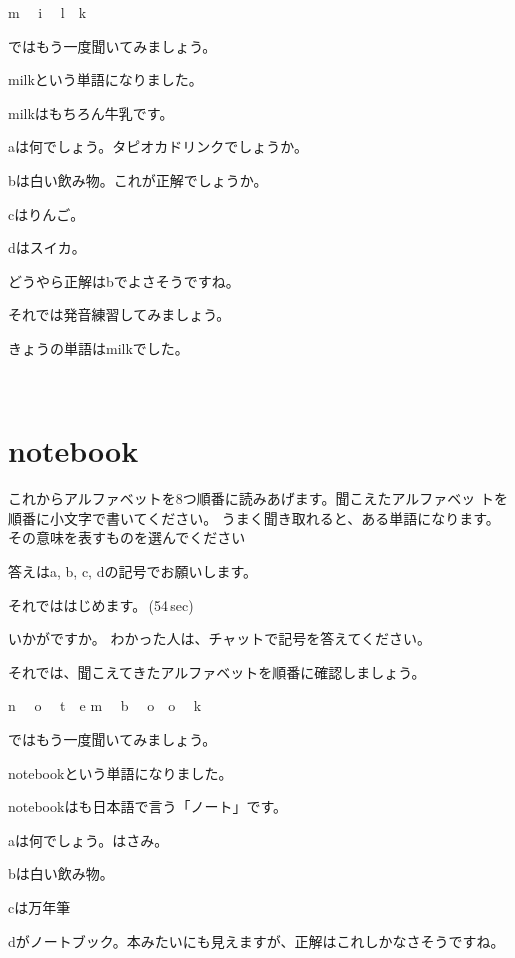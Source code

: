 \documentclass[12pt]{jlreq}
\begin{document}
m\,\,
{\large \ComputerMouse}\,\,
i\,\,
{\large \ComputerMouse}\,\,
l
{\large \ComputerMouse}\,\,
k\,\,

ではもう一度聞いてみましょう。

milkという単語になりました。

milkはもちろん牛乳です。

aは何でしょう。タピオカドリンクでしょうか。

bは白い飲み物。これが正解でしょうか。

cはりんご。

dはスイカ。

どうやら正解はbでよさそうですね。

それでは発音練習してみましょう。

きょうの単語はmilkでした。

{\large \ComputerMouse}\,\,
\newpage
\section{notebook}

これからアルファベットを8つ順番に読みあげます。聞こえたアルファベッ
トを順番に小文字で書いてください。
うまく聞き取れると、ある単語になります。
その意味を表すものを選んでください

答えはa, b, c, dの記号でお願いします。

それでははじめます。\faVolumeUp\,(54\,sec)

いかがですか。
わかった人は、チャットで記号を答えてください。

それでは、聞こえてきたアルファベットを順番に確認しましょう。{\large \ComputerMouse}

n\,\,
{\large \ComputerMouse}\,\,
o\,\,
{\large \ComputerMouse}\,\,
t
{\large \ComputerMouse}\,\,
e\,\,m\,\,
{\large \ComputerMouse}\,\,
b\,\,
{\large \ComputerMouse}\,\,
o
{\large \ComputerMouse}\,\,
o\,\,
{\large \ComputerMouse}\,\,
k\,\,

ではもう一度聞いてみましょう。

notebookという単語になりました。

notebookはも日本語で言う「ノート」です。

aは何でしょう。はさみ。

bは白い飲み物。

cは万年筆

dがノートブック。本みたいにも見えますが、正解はこれしかなさそうですね。
\end{document}
